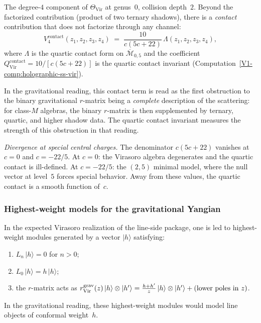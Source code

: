 \begin{computation}
\label{comp:thqg-V-quartic-graviton}
The degree-$4$ component of
$\Theta_{\mathrm{Vir}}$ at genus~$0$, collision depth~$2$.
Beyond the factorized contribution
(product of two ternary shadows), there is a
\emph{contact} contribution that does not factorize through
any channel:
\begin{equation}%
V_4^{\mathrm{contact}}(z_1, z_2, z_3, z_4)
\;=\;
\frac{10}{c(5c+22)}\,
\Lambda(z_1, z_2, z_3, z_4),
\end{equation}
where $\Lambda$ is the quartic contact form on
$\overline{\mathcal{M}}_{0,5}$ and the coefficient
$Q^{\mathrm{contact}}_{\mathrm{Vir}} = 10/[c(5c+22)]$ is the
quartic contact invariant
(Computation~\ref{V1-comp:holographic-ss-vir}).

In the gravitational reading, this contact term is read as the first
obstruction to the binary gravitational $r$-matrix being a
\emph{complete} description of the scattering: for class-$M$
algebras, the binary $r$-matrix is then supplemented by ternary,
quartic, and higher shadow data. The quartic contact invariant
measures the strength of this obstruction in that reading.

\emph{Divergence at special central charges.}
The denominator $c(5c+22)$ vanishes at $c = 0$ and
$c = -22/5$. At $c = 0$: the Virasoro algebra degenerates and the
quartic contact is ill-defined. At $c = -22/5$:
the $(2,5)$ minimal model, where the null vector at level~$5$ forces
special behavior. Away from these values, the quartic contact is a
smooth function of~$c$.
\end{computation}


\subsubsection{Highest-weight models for the gravitational Yangian}

\begin{definition}
In the expected Virasoro realization of the line-side package, one is
led to highest-weight modules generated by a vector
$|h\rangle$ satisfying:
\begin{enumerate}[label=\textup{(\roman*)}]
\item $L_n\,|h\rangle = 0$ for $n > 0$;
\item $L_0\,|h\rangle = h\,|h\rangle$;
\item the $r$-matrix acts as
 $r^{\mathrm{grav}}_{\mathrm{Vir}}(z)\,|h\rangle \otimes |h'\rangle
 = \frac{h + h'}{z}\,|h\rangle \otimes |h'\rangle
 + (\text{lower poles in }z)$.
\end{enumerate}
In the gravitational reading, these highest-weight modules would model
line objects of conformal weight~$h$.
\end{definition}

